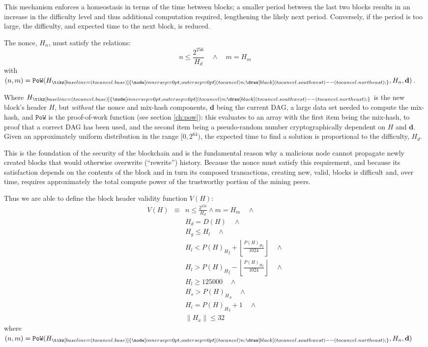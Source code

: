 \documentclass[9pt,oneside]{amsart}
\newcommand{\hcancel}[1]{%
    \tikz[baseline=(tocancel.base)]{
        \node[inner sep=0pt,outer sep=0pt] (tocancel) {#1};
        \draw[black] (tocancel.south west) -- (tocancel.north east);
    }%
}%
\begin{document}
\begin{multicols}{2}
This mechanism enforces a homeostasis in terms of the time between blocks; a smaller period between the last two blocks results in an increase in the difficulty level and thus additional computation required, lengthening the likely next period. Conversely, if the period is too large, the difficulty, and expected time to the next block, is reduced.

The nonce, $H_n$, must satisfy the relations:
\begin{equation}
n \leqslant \frac{2^{256}}{H_d} \quad \wedge \quad m = H_m
\end{equation}
with $(n, m) = \mathtt{PoW}(H_{\hcancel{n}}, H_n, \mathbf{d})$.

Where $H_{\hcancel{n}}$ is the new block's header $H$, but \textit{without} the nonce and mix-hash components, $\mathbf{d}$ being the current DAG, a large data set needed to compute the mix-hash, and $\mathtt{PoW}$ is the proof-of-work function (see section \ref{ch:pow}): this evaluates to an array with the first item being the mix-hash, to proof that a correct DAG has been used, and the second item being a pseudo-random number cryptographically dependent on $H$ and $\mathbf{d}$. Given an approximately uniform distribution in the range $[0, 2^{64})$, the expected time to find a solution is proportional to the difficulty, $H_d$.

This is the foundation of the security of the blockchain and is the fundamental reason why a malicious node cannot propagate newly created blocks that would otherwise overwrite (``rewrite'') history. Because the nonce must satisfy this requirement, and because its satisfaction depends on the contents of the block and in turn its composed transactions, creating new, valid, blocks is difficult and, over time, requires approximately the total compute power of the trustworthy portion of the mining peers.

Thus we are able to define the block header validity function $V(H)$:
\begin{eqnarray}
V(H) & \equiv &  n \leqslant \frac{2^{256}}{H_d} \wedge m = H_m \quad \wedge \\
& & H_d = D(H) \quad \wedge \\
& & H_g \le H_l  \quad \wedge \\
& & H_l < {P(H)_H}_l + \left\lfloor\frac{{P(H)_H}_l}{1024}\right\rfloor  \quad \wedge \\
& & H_l > {P(H)_H}_l - \left\lfloor\frac{{P(H)_H}_l}{1024}\right\rfloor  \quad \wedge \\
& & H_l \geqslant 125000  \quad \wedge \\
& & H_s > {P(H)_H}_s \quad \wedge \\
& & H_i = {P(H)_H}_i +1 \quad \wedge \\
& & \lVert H_x \rVert \le 32
\end{eqnarray}
where $(n, m) = \mathtt{PoW}(H_{\hcancel{n}}, H_n, \mathbf{d})$


\end{multicols}
\end{document}
